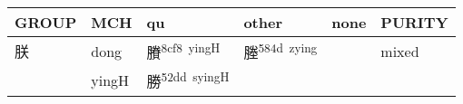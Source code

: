 \documentclass[14pt,a4paper]{scrartcl}
\begin{document}
\begin{longtable}[c]{@{}llllll@{}}
\toprule
\begin{minipage}[b]{0.14\columnwidth}\raggedright\strut
GROUP
\strut\end{minipage} &
\begin{minipage}[b]{0.14\columnwidth}\raggedright\strut
MCH
\strut\end{minipage} &
\begin{minipage}[b]{0.14\columnwidth}\raggedright\strut
qu
\strut\end{minipage} &
\begin{minipage}[b]{0.14\columnwidth}\raggedright\strut
other
\strut\end{minipage} &
\begin{minipage}[b]{0.14\columnwidth}\raggedright\strut
none
\strut\end{minipage} &
\begin{minipage}[b]{0.14\columnwidth}\raggedright\strut
PURITY
\strut\end{minipage}\tabularnewline
\midrule
\endhead
\begin{minipage}[t]{0.14\columnwidth}\raggedright\strut
朕
\strut\end{minipage} &
\begin{minipage}[t]{0.14\columnwidth}\raggedright\strut
dong
\strut\end{minipage} &
\begin{minipage}[t]{0.14\columnwidth}\raggedright\strut
賸\textsuperscript{8cf8~yingH}
\strut\end{minipage} &
\begin{minipage}[t]{0.14\columnwidth}\raggedright\strut
塍\textsuperscript{584d~zying}
\strut\end{minipage} &
\begin{minipage}[t]{0.14\columnwidth}\raggedright\strut
\strut\end{minipage} &
\begin{minipage}[t]{0.14\columnwidth}\raggedright\strut
mixed
\strut\end{minipage}\tabularnewline
\begin{minipage}[t]{0.14\columnwidth}\raggedright\strut
𦨶
\strut\end{minipage} &
\begin{minipage}[t]{0.14\columnwidth}\raggedright\strut
yingH
\strut\end{minipage} &
\begin{minipage}[t]{0.14\columnwidth}\raggedright\strut
勝\textsuperscript{52dd~syingH}
\strut\end{minipage} &

\end{longtable}
\end{document}

